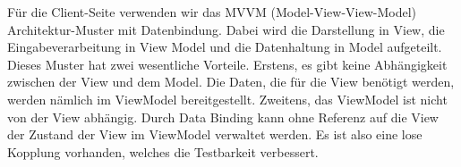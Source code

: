Für die Client-Seite verwenden wir das MVVM (Model-View-View-Model) Architektur-Muster mit Datenbindung. 
Dabei wird die Darstellung in View, die Eingabeverarbeitung in View Model und die Datenhaltung in Model aufgeteilt.
Dieses Muster hat zwei wesentliche Vorteile.
Erstens, es gibt keine Abhängigkeit zwischen der View und dem Model. Die Daten, die für die View benötigt werden, werden nämlich im ViewModel bereitgestellt.
Zweitens, das ViewModel ist nicht von der View abhängig. Durch Data Binding kann ohne Referenz auf die View der Zustand der View im ViewModel verwaltet werden. 
Es ist also eine lose Kopplung vorhanden, welches die Testbarkeit verbessert.
